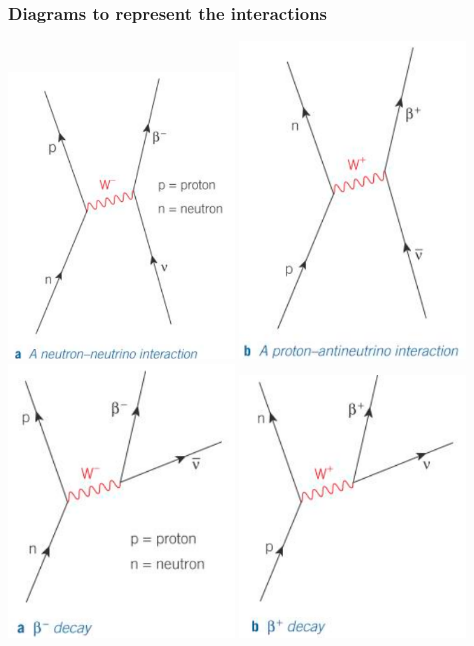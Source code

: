 \documentclass[12pt]{article}
\begin{document}
\subsubsection{Diagrams to represent the interactions}
\includegraphics[width=6cm]{neutron-neutrino.png}
\includegraphics[width=6cm]{proton-antineutrino.png}
\includegraphics[width=6cm]{betaminus.png}
\includegraphics[width=6cm]{betaplus.png}
\end{document}
